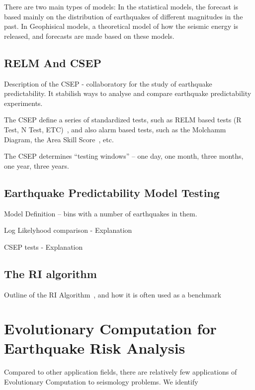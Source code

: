 \documentclass{sig-alternate}
\begin{document}
There are two main types of models: In the statistical models, the
forecast is based mainly on the distribution of earthquakes of
different magnitudes in the past. In Geophisical models, a theoretical
model of how the seismic energy is released, and forecasts are made
based on these models.


\subsection{RELM And CSEP}

Description of the CSEP - collaboratory for the study of earthquake
predictability.  It stabilish ways to analyse and compare earthquake
predictability experiments.

The CSEP define a series of standardized tests, such as RELM based
tests (R Test, N Test, ETC)~\cite{Schorlemmer2007}, and also alarm
based tests, such as the Molchamm Diagram, the Area Skill
Score~\cite{Zechar2010}, etc.

The CSEP determines ``testing windows'' -- one day, one month, three
months, one year, three years.

\subsection{Earthquake Predictability Model Testing}

Model Definition -- bins with a number of earthquakes in them.

Log Likelyhood comparison - Explanation

CSEP tests - Explanation

\subsection{The RI algorithm}

Outline of the RI Algorithm~\cite{Nanjo2011}, and how it is often used as a benchmark


\section{Evolutionary Computation for Earthquake Risk Analysis}

Compared to other application fields, there are relatively few
applications of Evolutionary Computation to seismology problems.
We identify 
\end{document}
